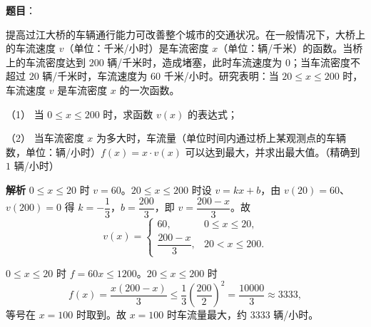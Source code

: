 \begin{answer}

\textbf{题目}：

提高过江大桥的车辆通行能力可改善整个城市的交通状况。在一般情况下，大桥上的车流速度 $v$（单位：千米/小时）是车流密度 $x$（单位：辆/千米）的函数。当桥上的车流密度达到 $200$ 辆/千米时，造成堵塞，此时车流速度为 $0$；当车流密度不超过 $20$ 辆/千米时，车流速度为 $60$ 千米/小时。研究表明：当 $20\leqslant x\leqslant200$ 时，车流速度 $v$ 是车流密度 $x$ 的一次函数。

（1） 当 $0\leqslant x\leqslant200$ 时，求函数 $v(x)$ 的表达式；

（2） 当车流密度 $x$ 为多大时，车流量（单位时间内通过桥上某观测点的车辆数，单位：辆/小时）$f(x)=x\cdot v(x)$ 可以达到最大，并求出最大值。（精确到 $1$ 辆/小时）

\textbf{解析}
$0\leqslant x\leqslant20$ 时 $v=60$。$20\leqslant x\leqslant200$ 时设 $v=kx+b$，由 $v(20)=60$、$v(200)=0$ 得 $k=-\dfrac13$，$b=\dfrac{200}3$，即 $v=\dfrac{200-x}3$。故
\nopagebreak[4]
\[v(x)=\begin{cases}60,&0\leqslant x\leqslant20,\\[4pt]\dfrac{200-x}3,&20<x\leqslant200.\end{cases}\]

$0\leqslant x\leqslant20$ 时 $f=60x\leqslant1200$。$20\leqslant x\leqslant200$ 时
\nopagebreak[4]
\[f(x)=\frac{x(200-x)}3\leqslant\frac1{3}\left(\frac{200}2\right)^2=\frac{10000}3\approx3333,\]
等号在 $x=100$ 时取到。故 $x=100$ 时车流量最大，约 $3333$ 辆/小时。



\end{answer}
